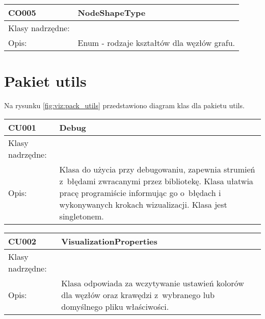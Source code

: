 \begin{center}
\begin{longtable}{|m{3.5cm}|m{8.5cm}|}
\end{longtable}

\begin{longtable}{|m{3.5cm}|m{8.5cm}|} \hline

CO005 & NodeShapeType \\ \hline
Klasy nadrzędne: &     \\ \hline
Opis: &  Enum - rodzaje kształtów dla węzłów grafu.   \\ \hline

\end{longtable}

\end{center}


\section{Pakiet utils}


Na rysunku  \figurename \space \ref{fig:viz:pack_utils}  przedstawiono diagram klas dla pakietu utils.


\begin{center}

\begin{longtable}{|m{3.5cm}|m{8.5cm}|} \hline

CU001 & Debug \\ \hline
Klasy nadrzędne: &     \\ \hline
Opis: & Klasa do użycia przy debugowaniu, zapewnia strumień z~błędami zwracanymi przez bibliotekę. Klasa ułatwia pracę programiście informując go
o~błędach i wykonywanych krokach wizualizacji.  Klasa jest singletonem.\\ \hline


\end{longtable}

\begin{longtable}{|m{3.5cm}|m{8.5cm}|} \hline
 
CU002 & VisualizationProperties \\ \hline
Klasy nadrzędne: &     \\ \hline
Opis: & Klasa odpowiada za wczytywanie ustawień kolorów dla węzłów oraz krawędzi z~wybranego lub domyślnego pliku właściwości. \\ \hline

\end{longtable}
\end{center}


